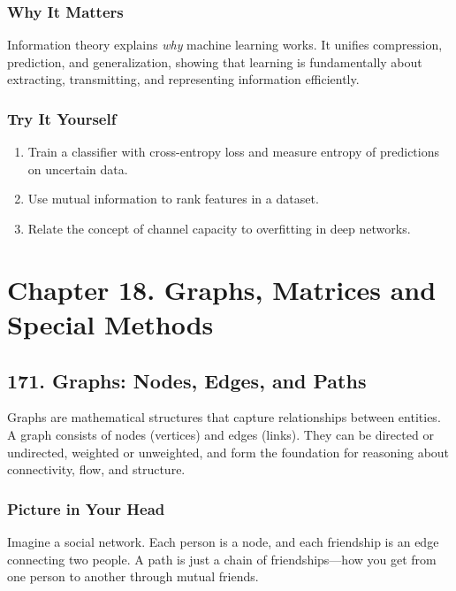 \documentclass[
  letterpaper,
  DIV=11,
  numbers=noendperiod]{scrreprt}
\providecommand{\tightlist}{%
  \setlength{\itemsep}{0pt}\setlength{\parskip}{0pt}}
\begin{document}
\subsubsection{Why It Matters}\label{why-it-matters-67}

Information theory explains \emph{why} machine learning works. It
unifies compression, prediction, and generalization, showing that
learning is fundamentally about extracting, transmitting, and
representing information efficiently.

\subsubsection{Try It Yourself}\label{try-it-yourself-169}

\begin{enumerate}
\def\labelenumi{\arabic{enumi}.}
\tightlist
\item
  Train a classifier with cross-entropy loss and measure entropy of
  predictions on uncertain data.
\item
  Use mutual information to rank features in a dataset.
\item
  Relate the concept of channel capacity to overfitting in deep
  networks.
\end{enumerate}

\section{Chapter 18. Graphs, Matrices and Special
Methods}\label{chapter-18.-graphs-matrices-and-special-methods}

\subsection{171. Graphs: Nodes, Edges, and
Paths}\label{graphs-nodes-edges-and-paths}

Graphs are mathematical structures that capture relationships between
entities. A graph consists of nodes (vertices) and edges (links). They
can be directed or undirected, weighted or unweighted, and form the
foundation for reasoning about connectivity, flow, and structure.

\subsubsection{Picture in Your Head}\label{picture-in-your-head-170}

Imagine a social network. Each person is a node, and each friendship is
an edge connecting two people. A path is just a chain of
friendships---how you get from one person to another through mutual
friends.
\end{document}
